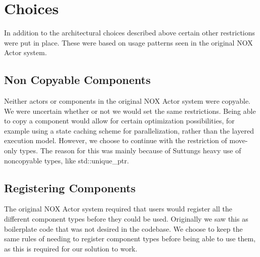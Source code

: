 \section{Choices}
In addition to the architectural choices described above certain other restrictions
were put in place.
These were based on usage patterns seen in the original NOX Actor system.

\subsection{Non Copyable Components}
Neither actors or components in the original NOX Actor system were copyable.
We were uncertain whether or not we would set the same restrictions.
Being able to copy a component would allow for certain optimization possibilities,
for example using a state caching scheme\cite[p. 930]{game_engine_architecture} for parallelization,
rather than the layered execution model.
However, we choose to continue with the restriction of move-only types.
The reason for this was mainly because of Suttungs heavy use of noncopyable types,
like std::unique\_ptr.

\subsection{Registering Components}
The original NOX Actor system required that users would register all the different component types before they could be used.
Originally we saw this as boilerplate code that was not desired in the codebase.
We choose to keep the same rules of needing to register component types before being able to use them, as this is required for our solution to work.
